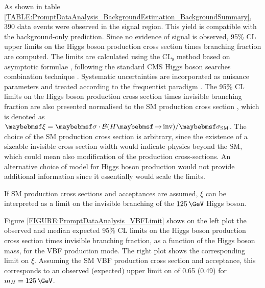 
As shown in table \ref{TABLE:PromptDataAnalysis_BackgroundEstimation_BackgroundSummary}, 390 data events were observed in the signal region. This yield is compatible with the background-only prediction. Since no evidence of signal is observed, 95\% \gls{CL} upper limits on the Higgs boson production cross section times branching fraction are computed. The limits are calculated using the $\mathrm{CL}_\mathrm{s}$ method \cite{ARTICLE:HandbookofLHCHiggsCrossSectionsDifferentialDistributions,ARTICLE:CLsTechnique,ARTICLE:CLCompForCombiningSearchesWithSmallStat} based on asymptotic formulae \cite{ARTICLE:AsymptoticCLS}, following the standard \gls{CMS} Higgs boson searches combination technique \cite{ARTICLE:CMS_HiggsDiscovery,ARTICLE:HiggsCombination}. Systematic uncertainties are incorporated as nuisance parameters and treated according to the frequentist paradigm \cite{ARTICLE:HiggsCombination}. The 95\% \gls{CL} limits on the Higgs boson production cross section times invisible branching fraction are also presented normalised to the \gls{SM} production cross section \cite{ARTICLE:HandbookofLHCHiggsCrossSectionsInclusiveObservables,ARTICLE:HandbookofLHCHiggsCrossSectionsDifferentialDistributions}, which is denoted as $\xi = \sigma \cdot \BRinv / \sigma_\mathrm{SM}$. The choice of the \gls{SM} production cross section is arbitrary, since the existence of a sizeable invisible cross section width would indicate physics beyond the \gls{SM}, which could mean also modification of the production cross-sections. An alternative choice of model for Higgs boson production would not provide additional information since it essentially would scale the limits.

If \gls{SM} production cross sections and acceptances are assumed, $\xi$ can be interpreted as a limit on the invisible branching of the $125\,\GeV$ Higgs boson.

Figure \ref{FIGURE:PromptDataAnalysis_VBFLimit} shows on the left plot the observed and median expected 95\% \gls{CL} limits on the Higgs boson production cross section times invisible branching fraction, as a function of the Higgs boson mass, for the \gls{VBF} production mode. The right plot shows the corresponding limit on $\xi$.  Assuming the \gls{SM} \gls{VBF} production cross section and acceptance, this corresponds to an observed (expected) upper limit on \BRinv of 0.65 (0.49) for $m_H=125\,\GeV$.

